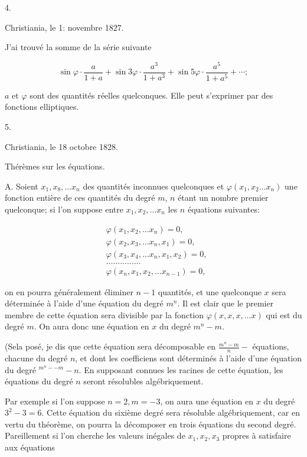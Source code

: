 \documentclass{article}
\begin{document}
4.

Christiania, le 1: novembre 1827.

J'ai trouvé la somme de la série suivante

\[
\sin \varphi \cdot \frac{a}{1+a}+\sin 3 \varphi \cdot \frac{a^{3}}{1+a^{3}}+\sin 5 \varphi \cdot \frac{a^{5}}{1+a^{5}}+\cdots ;
\]

\(a\) et \(\varphi\) sont des quantités réelles quelconques. Elle peut s'exprimer par des fonctions elliptiques.

5.

Christiania, le 18 octobre 1828.

Thérèmes sur les équations.

A. Soient \(x_{1}, x_{8}, \ldots x_{n}\) des quantités inconnues quelconques et \(\varphi\left(x_{1}, x_{2} \ldots x_{n}\right)\) une fonction entière de ces quantités du degré \(m\), \(n\) étant un nombre premier quelconque; si l'on suppose entre \(x_{1}, x_{2}, \ldots x_{n}\) les \(n\) équations suivantes:

\[
\begin{aligned}
& \varphi\left(x_{1}, x_{2}, \ldots x_{n}\right)=0, \\
& \varphi\left(x_{2}, x_{3}, \ldots x_{n}, x_{1}\right)=0, \\
& \varphi\left(x_{3}, x_{4}, \ldots x_{n}, x_{1}, x_{2}\right)=0, \\
& \ldots . . . . . . . . . . . . \\
& \varphi\left(x_{n}, x_{1}, x_{2}, \ldots x_{n-1}\right)=0,
\end{aligned}
\]

on en pourra généralement éliminer \(n-1\) quantités, et une quelconque \(x\) sera déterminée à l'aide d'une équation du degré \(m^{n}\). Il est clair que le premier membre de cette équation sera divisible par la fonction \(\varphi(x, x, x, \ldots x)\) qui est du degré \(m\). On aura donc une équation en \(x\) du degré \(m^{n}-m\).

(Sela posé, je dis que cette équation sera décomposable en \(\frac{m^{n}-m}{n}-\) équations, chacune du degré \(n\), et dont les coefficiens sont déterminés à l'aide d'une équation du degré \({ }^{m^{n}--m}-n\). En supposant connues les racines de cette équation, les équations du degré \(n\) seront résolubles algébriquement.

Par exemple si l'on suppose \(n=2, m=-3\), on aura une équation en \(x\) du degré \(3^{2}-3=6\). Cette équation du sixième degré sera résoluble algébriquement, car en vertu du théorème, on pourra la décomposer en trois équations du second degré. Pareillement si l'on cherche les valeurs inégales de \(x_{1}, x_{2}, x_{3}\) propres à satisfaire aux équations
\end{document}
